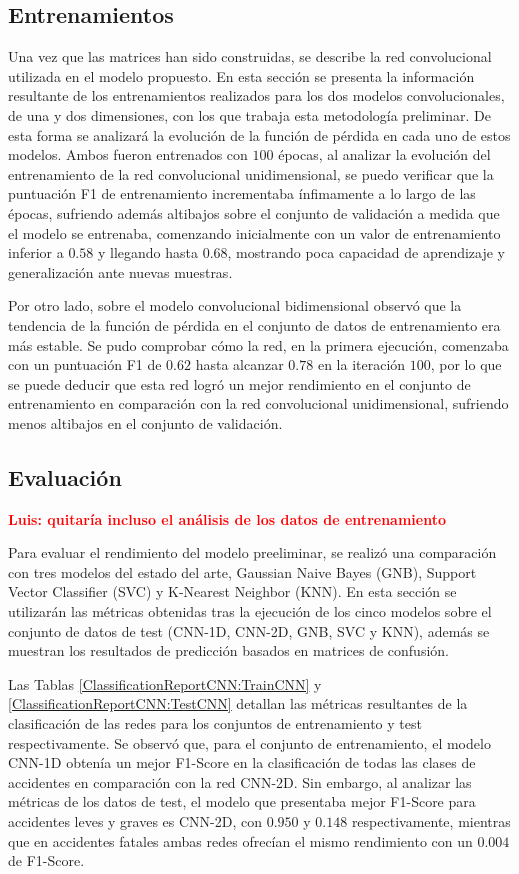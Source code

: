 \documentclass{uathesis-es}
\begin{document}
{\subsection*{Entrenamientos}

Una vez que las matrices han sido construidas, se describe la red convolucional utilizada en el modelo propuesto. En esta sección se presenta la información resultante de los entrenamientos realizados para los dos modelos convolucionales, de una y dos dimensiones, con los que trabaja esta metodología preliminar. De esta forma se analizará la evolución de la función de pérdida en cada uno de estos modelos. Ambos fueron entrenados con $100$ épocas, al analizar la evolución del entrenamiento de la red convolucional unidimensional, se puedo verificar que la puntuación F1 de entrenamiento incrementaba ínfimamente a lo largo de las épocas, sufriendo además altibajos sobre el conjunto de validación a medida que el modelo se entrenaba, comenzando inicialmente con un valor de entrenamiento inferior a $0.58$ y llegando hasta $0.68$, mostrando poca capacidad de aprendizaje y generalización ante nuevas muestras.

Por otro lado, sobre el modelo convolucional bidimensional observó que la tendencia de la función de pérdida en el conjunto de datos de entrenamiento era más estable. Se pudo comprobar cómo la red, en la primera ejecución, comenzaba con un puntuación F1 de $0.62$ hasta alcanzar $0.78$ en la iteración $100$, por lo que se puede deducir que esta red logró un mejor rendimiento en el conjunto de entrenamiento en comparación con la red convolucional unidimensional, sufriendo menos altibajos en el conjunto de validación.


\subsection*{Evaluación}

\textcolor{red}{\textbf{Luis: quitaría incluso el análisis de los datos de entrenamiento}}

Para evaluar el rendimiento del modelo preeliminar, se realizó una comparación con tres modelos del estado del arte, Gaussian Naive Bayes (GNB), Support Vector Classifier (SVC) y K-Nearest Neighbor (KNN). En esta sección se utilizarán las métricas obtenidas tras la ejecución de los cinco modelos sobre el conjunto de datos de test (CNN-1D, CNN-2D, GNB, SVC y KNN), además se muestran los resultados de predicción basados en matrices de confusión.

Las Tablas \ref{ClassificationReportCNN:TrainCNN} y \ref{ClassificationReportCNN:TestCNN} detallan las métricas resultantes de la clasificación de las redes para los conjuntos de entrenamiento y test respectivamente. Se observó que, para el conjunto de entrenamiento, el modelo CNN-1D obtenía un mejor F1-Score en la clasificación de todas las clases de accidentes en comparación con la red CNN-2D. Sin embargo, al analizar las métricas de los datos de test, el modelo que presentaba mejor F1-Score para accidentes leves y graves es CNN-2D, con $0.950$ y $0.148$ respectivamente, mientras que en accidentes fatales ambas redes ofrecían el mismo rendimiento con un $0.004$ de F1-Score.

}
\end{document}
